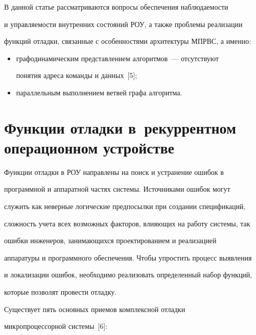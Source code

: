       


      В данной статье рассматриваются вопросы обеспечения наблюдаемости 


и управляемости внутренних состояний РОУ, а также проблемы реализации 


функций отладки, связанные с особенностями архитектуры МПРВС, а именно:


      \begin{itemize}


\item   графодинамическим представлением алгоритмов~--- отсутствуют 


понятия адреса команды и данных~[5];


      \item параллельным выполнением ветвей графа алгоритма.


      \end{itemize}


      


\section{Функции отладки в~рекуррентном операционном устройстве}


      


      Функции отладки в РОУ направлены на поиск и устранение ошибок в 


программной и аппаратной частях системы. Источниками ошибок могут 


служить как неверные логические предпосылки при создании спецификаций, 


сложность учета всех возможных факторов, влияющих на работу системы, так  


ошибки инженеров, занимающихся проектированием и реализацией 


аппаратуры и программного обеспечения. Чтобы упростить процесс выявления 


и локализации ошибок, необходимо реализовать определенный набор функций, 


которые позволят провести отладку.


      


      Существует пять основных приемов комплексной отладки 


микропроцессорной системы~[6]:


